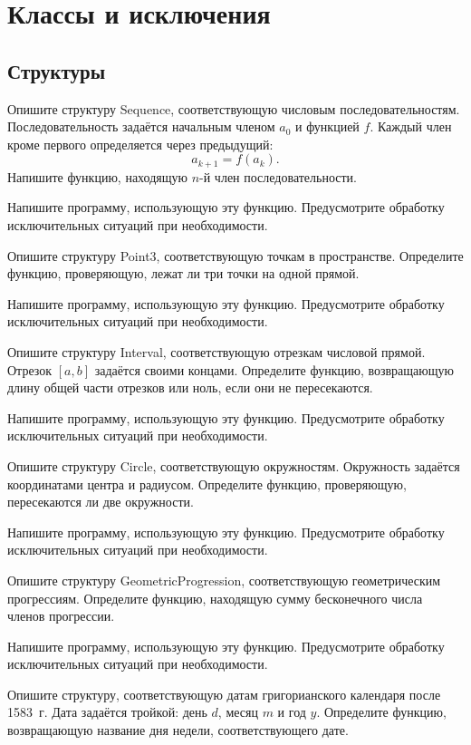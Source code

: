 \section{Классы и исключения}

\subsection{Структуры}

\task Опишите структуру Sequence, соответствующую числовым
последовательностям. Последовательность задаётся начальным членом
$a_0$ и функцией $f$. Каждый член кроме первого определяется через
предыдущий:
\[
a_{k+1} = f(a_k).
\]
Напишите функцию, находящую $n$-й член последовательности.

Напишите программу, использующую эту функцию. Предусмотрите обработку
исключительных ситуаций при необходимости.

\task Опишите структуру Point3, соответствующую точкам в
пространстве. Определите функцию, проверяющую, лежат ли три точки на
одной прямой.

Напишите программу, использующую эту функцию. Предусмотрите обработку
исключительных ситуаций при необходимости.

\task Опишите структуру Interval, соответствующую отрезкам числовой
прямой. Отрезок $[a, b]$ задаётся своими концами. Определите функцию,
возвращающую длину общей части отрезков или ноль, если они не
пересекаются.

Напишите программу, использующую эту функцию. Предусмотрите обработку
исключительных ситуаций при необходимости.

\task Опишите структуру Circle, соответствующую
окружностям. Окружность задаётся координатами центра и
радиусом. Определите функцию, проверяющую, пересекаются ли две
окружности.

Напишите программу, использующую эту функцию. Предусмотрите обработку
исключительных ситуаций при необходимости.

\task Опишите структуру GeometricProgression, соответствующую
геометрическим прогрессиям. Определите функцию, находящую сумму
бесконечного числа членов прогрессии.

Напишите программу, использующую эту функцию. Предусмотрите обработку
исключительных ситуаций при необходимости.

\task Опишите структуру, соответствующую датам григорианского
календаря после 1583~г. Дата задаётся тройкой: день $d$, месяц $m$ и
год $y.$ Определите функцию, возвращающую название дня недели,
соответствующего дате.

